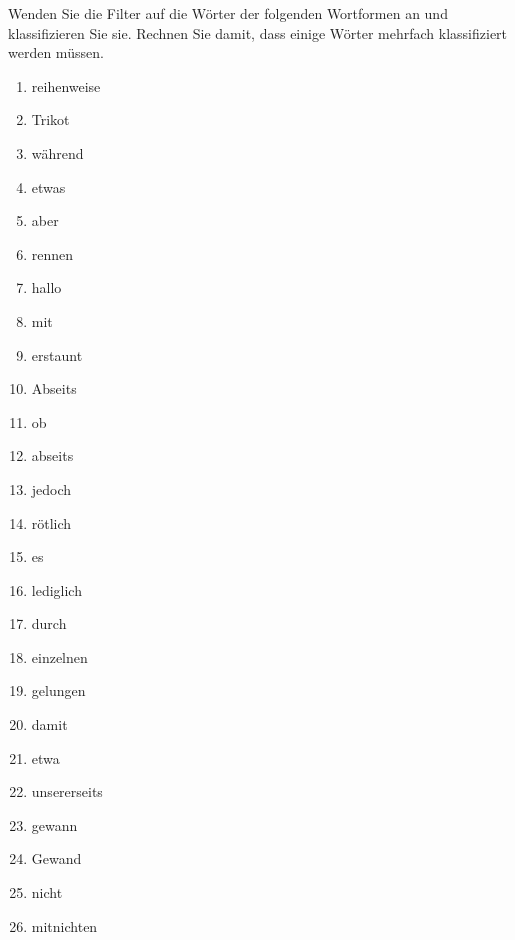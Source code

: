 \Uebung \label{u55} Wenden Sie die Filter auf die Wörter der folgenden Wortformen an und klassifizieren Sie sie.
Rechnen Sie damit, dass einige Wörter mehrfach klassifiziert werden müssen.

\begin{enumerate}\Lf
  \item reihenweise
  \item Trikot
  \item während
  \item etwas
  \item aber
  \item rennen
  \item hallo
  \item mit
  \item erstaunt
  \item Abseits
  \item ob
  \item abseits
  \item jedoch
  \item rötlich
  \item es
  \item lediglich
  \item durch
  \item einzelnen
  \item gelungen
  \item damit
  \item etwa
  \item unsererseits
  \item gewann
  \item Gewand
  \item nicht
  \item mitnichten
\end{enumerate}

